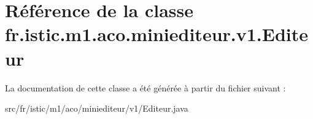 \hypertarget{classfr_1_1istic_1_1m1_1_1aco_1_1miniediteur_1_1v1_1_1Editeur}{}\section{Référence de la classe fr.\+istic.\+m1.\+aco.\+miniediteur.\+v1.\+Editeur}
\label{classfr_1_1istic_1_1m1_1_1aco_1_1miniediteur_1_1v1_1_1Editeur}


La documentation de cette classe a été générée à partir du fichier suivant \+:\begin{DoxyCompactItemize}
\item 
src/fr/istic/m1/aco/miniediteur/v1/Editeur.\+java\end{DoxyCompactItemize}
